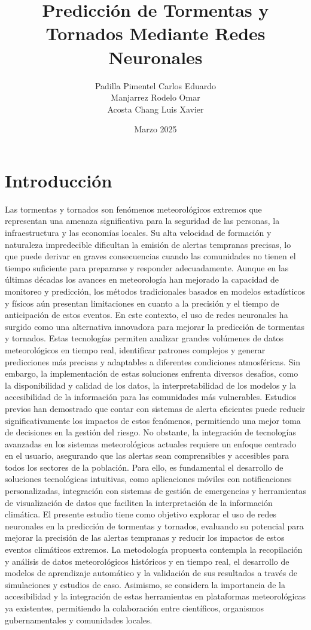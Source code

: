\documentclass{article}
\title{Predicción de Tormentas y Tornados Mediante Redes Neuronales}
\author{
    Padilla Pimentel Carlos Eduardo \\
    Manjarrez Rodelo Omar \\
    Acosta Chang Luis Xavier
}
\date{Marzo 2025}
\begin{document}
\maketitle

\tableofcontents
\newpage

\section{Introducción}
Las tormentas y tornados son fenómenos meteorológicos extremos que representan una amenaza significativa para la seguridad de las personas, la infraestructura y las economías locales. Su alta velocidad de formación y naturaleza impredecible dificultan la emisión de alertas tempranas precisas, lo que puede derivar en graves consecuencias cuando las comunidades no tienen el tiempo suficiente para prepararse y responder adecuadamente. Aunque en las últimas décadas los avances en meteorología han mejorado la capacidad de monitoreo y predicción, los métodos tradicionales basados en modelos estadísticos y físicos aún presentan limitaciones en cuanto a la precisión y el tiempo de anticipación de estos eventos.
En este contexto, el uso de redes neuronales ha surgido como una alternativa innovadora para mejorar la predicción de tormentas y tornados. Estas tecnologías permiten analizar grandes volúmenes de datos meteorológicos en tiempo real, identificar patrones complejos y generar predicciones más precisas y adaptables a diferentes condiciones atmosféricas. Sin embargo, la implementación de estas soluciones enfrenta diversos desafíos, como la disponibilidad y calidad de los datos, la interpretabilidad de los modelos y la accesibilidad de la información para las comunidades más vulnerables.
Estudios previos han demostrado que contar con sistemas de alerta eficientes puede reducir significativamente los impactos de estos fenómenos, permitiendo una mejor toma de decisiones en la gestión del riesgo. No obstante, la integración de tecnologías avanzadas en los sistemas meteorológicos actuales requiere un enfoque centrado en el usuario, asegurando que las alertas sean comprensibles y accesibles para todos los sectores de la población. Para ello, es fundamental el desarrollo de soluciones tecnológicas intuitivas, como aplicaciones móviles con notificaciones personalizadas, integración con sistemas de gestión de emergencias y herramientas de visualización de datos que faciliten la interpretación de la información climática.
El presente estudio tiene como objetivo explorar el uso de redes neuronales en la predicción de tormentas y tornados, evaluando su potencial para mejorar la precisión de las alertas tempranas y reducir los impactos de estos eventos climáticos extremos. La metodología propuesta contempla la recopilación y análisis de datos meteorológicos históricos y en tiempo real, el desarrollo de modelos de aprendizaje automático y la validación de sus resultados a través de simulaciones y estudios de caso. Asimismo, se considera la importancia de la accesibilidad y la integración de estas herramientas en plataformas meteorológicas ya existentes, permitiendo la colaboración entre científicos, organismos gubernamentales y comunidades locales.
\end{document}
